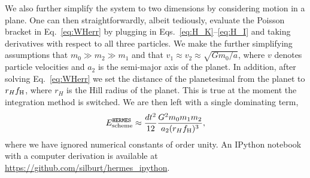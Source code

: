We also further simplify the system to two dimensions by considering motion in a plane. 
One can then straightforwardly, albeit tediously, evaluate the Poisson bracket in Eq.~\ref{eq:WHerr} by plugging in Eqs.~\ref{eq:H_K}--\ref{eq:H_I} and taking derivatives with respect to all three particles. 
We make the further simplifying assumptions that $m_0 \gg m_2 \gg m_1$ and that $v_1 \approx v_2 \approx \sqrt{Gm_0/a}$, where $v$ denotes particle velocities and $a_2$ is the semi-major axis of the planet.
In addition, after solving Eq.~\ref{eq:WHerr} we set the distance of the planetesimal from the planet to $r_{H}f_{\rm H}$, where $r_{H}$ is the Hill radius of the planet. 
This is true at the moment the integration method is switched.
We are then left with a single dominating term,
\begin{equation}
\begin{split}
E_{\rm scheme}^{{\sc \tt HERMES}} \approx \frac{dt^2}{12} \frac{G^2 m_0m_1m_2}{a_2(r_{H}f_{\rm H})^3},
\label{eq:Escheme}
\end{split}
\end{equation}
where we have ignored numerical constants of order unity.
An IPython notebook with a computer derivation is available at \url{https://github.com/silburt/hermes_ipython}.

